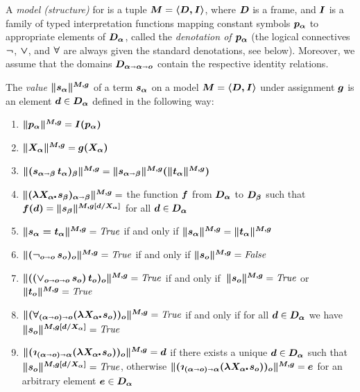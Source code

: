 \begin{defn}\label{holmodel}
  A \emph{model (structure)} for \HOL is a tuple $\boldsymbol{M}=\boldsymbol{\langle D, I \rangle}$, where
  $\boldsymbol{D}$ is a frame, and $\boldsymbol{I}$ is a family of typed interpretation
  functions mapping constant symbols $\boldsymbol{p_\alpha}$ to appropriate
  elements of $\boldsymbol{D_\alpha}$, called the \emph{denotation of $\boldsymbol{p_\alpha}$}
  (the logical connectives $\boldsymbol{\neg}$, $\boldsymbol{\vee}$, and $\boldsymbol{\forall}$ are always
  given the standard denotations, see below).  Moreover, we assume that the domains
  $\boldsymbol{D_{\alpha\shortrightarrow\alpha\shortrightarrow o}}$ contain the respective identity relations.
\end{defn}


\begin{defn}\label{holvalue}
  The \emph{value} $\boldsymbol{\| s_\alpha\|^{M,g}}$ of a \HOL term
  $\boldsymbol{s_\alpha}$ on a model $\boldsymbol{M}=\boldsymbol{\langle D, I \rangle}$ under assignment $\boldsymbol{g}$ is an element $\boldsymbol{d}\in \boldsymbol{D_\alpha}$
  defined in the following way:
\begin{enumerate}
\item $\boldsymbol{\|p_\alpha\|^{M,g}} = \boldsymbol{I(p_\alpha)}$ 
\item $\boldsymbol{\|X_\alpha\|^{M,g}} = \boldsymbol{g(X_\alpha)}$
\item $\boldsymbol{\|(s_{\alpha\shortrightarrow\beta}\, t_\alpha)_\beta\|^{M,g}} = \boldsymbol{\|s_{\alpha\shortrightarrow\beta}\|^{M,g}(\|t_\alpha\|^{M,g})}$
\item $\hol{\|(\lam{X_\alpha}s_\beta)_{\alpha\ar\beta}\|^{M,g}} = $
  the function $\boldsymbol{f}$ from $\boldsymbol{D_\alpha}$ to $\boldsymbol{D_\beta}$ such
  that $\boldsymbol{f(d)} = \boldsymbol{\|s_\beta\|^{M,g[d/X_\alpha]}}$ for all
  $\boldsymbol{d}\in \boldsymbol{D_\alpha}$
\item $\boldsymbol{\|s_\alpha = t_\alpha\|^{M,g}} = {\mathit{True}}$ if and only if $\boldsymbol{\|s_\alpha\|^{M,g}} = \boldsymbol{\|t_\alpha\|^{M,g}} $
\item $\boldsymbol{\|(\neg_{o\shortrightarrow o}\, s_o)_o\|^{M,g}} = {\mathit{True}}$ if and only if $\boldsymbol{\|s_o\|^{M,g}} = {\mathit{False}}$
\item \sloppy $\boldsymbol{\|(({\vee_{o\shortrightarrow o\shortrightarrow o}}\,s_o)\,t_o)_o\|^{M,g}} =
  {\mathit{True}}$ if and only if\, $\boldsymbol{\|s_o\|^{M,g}} = {\mathit{True}}$ or $\boldsymbol{\|t_o\|^{M,g}}
  = {\mathit{True}}$
\item \sloppy $\hol{\|(\forall_{(\alpha\ar o)\ar o}(\lam{X_\alpha}
    s_o))_o\|^{M,g}} = {\True}$ if and only if for all $\boldsymbol{d}\in
  \boldsymbol{D_\alpha}$ we have $\boldsymbol{\|s_o\|^{M,g[d/X_\alpha]}} = {\mathit{True}}$
\item $\hol{\|(\Descr_{(\alpha\ar o)\ar \alpha}(\lam{X_\alpha}
    s_o))_o\|^{M,g}} = \hol{d}$ if there exists a unique $\boldsymbol{d}\in \boldsymbol{D_{\alpha}}$ such that
  $\boldsymbol{\|s_o\|^{M,g[d/X_\alpha]}} = {\mathit{True}}$, 
otherwise  $\hol{\|(\Descr_{(\alpha\ar o)\ar \alpha}(\lam{X_\alpha}
    s_o))_o\|^{M,g}} = \hol{e}$ for an arbitrary element $\boldsymbol{e}\in \boldsymbol{D_{\alpha}}$
\end{enumerate}
\end{defn}


